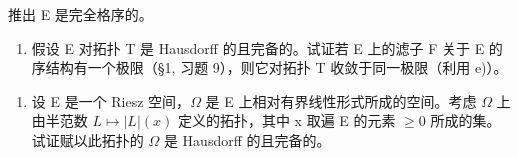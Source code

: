 推出 E 是完全格序的。

\begin{enumerate}
\def\labelenumi{\alph{enumi})}
\setcounter{enumi}{5}
\tightlist
\item
  假设 E 对拓扑 T 是 Hausdorff 的且完备的。试证若 E 上的滤子 F 关于 E 的序结构有一个极限（§1, 习题 9），则它对拓扑 T 收敛于同一极限（利用 e)）。
\end{enumerate}

\begin{enumerate}
\def\labelenumi{\arabic{enumi})}
\setcounter{enumi}{8}
\tightlist
\item
  设 E 是一个 Riesz 空间，\(\Omega\) 是 E 上相对有界线性形式所成的空间。考虑 \(\Omega\) 上由半范数 \(L \mapsto |L|(x)\) 定义的拓扑，其中 x 取遍 E 的元素 \(\geqslant 0\) 所成的集。试证赋以此拓扑的 \(\Omega\) 是 Hausdorff 的且完备的。
\end{enumerate}

